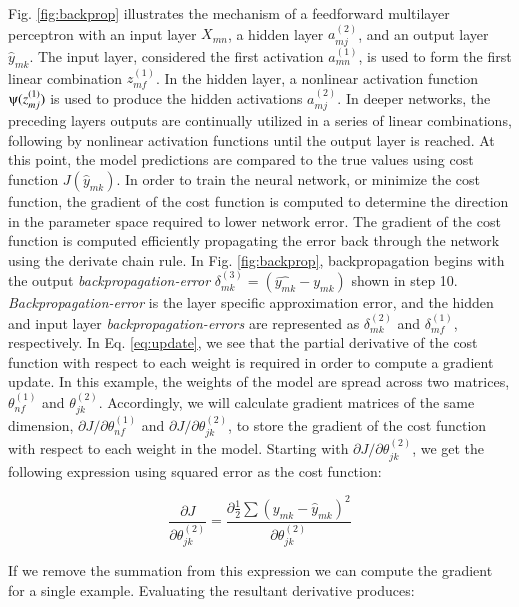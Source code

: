 Fig. \ref{fig:backprop} illustrates the mechanism of a feedforward multilayer perceptron with an input layer $X_{mn}$, a hidden layer $a_{mj}^{(2)}$, and an output layer $\hat{y}_{mk}$. The input layer, considered the first activation $a_{mn}^{(1)}$, is used to form the first linear combination $z_{mf}^{(1)}$. In the hidden layer, a nonlinear activation function $\psiup(z_{mj}^{(1)})$ is used to produce the hidden activations $a_{mj}^{(2)}$. In deeper networks, the preceding layers outputs are continually utilized in a series of linear combinations, following by nonlinear activation functions until the output layer is reached. At this point, the model predictions are compared to the true values using cost function $J(\hat{y}_{mk})$. In order to train the neural network, or minimize the cost function, the gradient of the cost function is computed to determine the direction in the parameter space required to lower network error. The gradient of the cost function is computed efficiently propagating the error back through the network using the derivate chain rule. In Fig. \ref{fig:backprop}, backpropagation begins with the output \textit{backpropagation-error} $\delta_{mk}^{(3)} = (\hat{y_{mk}} - y_{mk})$ shown in step 10. \textit{Backpropagation-error} is the layer specific approximation error, and the hidden and input layer \textit{backpropagation-errors} are represented as $\delta_{mk}^{(2)}$ and $\delta_{mf}^{(1)}$, respectively. In Eq. \ref{eq:update}, we see that the partial derivative of the cost function with respect to each weight is required in order to compute a gradient update. In this example, the weights of the model are spread across two matrices, $\theta_{nf}^{(1)}$ and $\theta_{jk}^{(2)}$. Accordingly, we will calculate gradient matrices of the same dimension, $\partial J / \partial \theta_{nf}^{(1)}$ and $\partial J / \partial \theta_{jk}^{(2)}$, to store the gradient of the cost function with respect to each weight in the model. Starting with $\partial J / \partial \theta_{jk}^{(2)}$, we get the following expression using squared error as the cost function:

\begin{equation*}
    \frac{\partial J}{\partial \theta_{jk}^{(2)}} =  \frac{\partial \frac{1}{2}\sum (y_{mk} - \hat{y}_{mk})^{2}}{\partial \theta_{jk}^{(2)}}
\end{equation*}

\noindent
If we remove the summation from this expression we can compute the gradient for a single example. Evaluating the resultant derivative produces:

